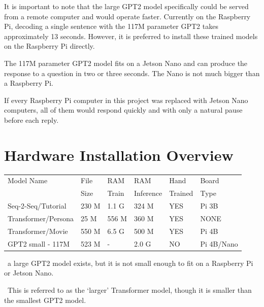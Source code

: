 It is important to note that the large GPT2 model specifically could be served from a remote computer and would operate faster. Currently on the Raspberry Pi, decoding a single sentence with the 117M parameter GPT2 takes approximately 13 seconds. However, it is preferred to install these trained models on the Raspberry Pi directly.

The 117M parameter GPT2 model fits on a Jetson Nano and can produce the response to a question in two or three seconds. The Nano is not much bigger than a Raspberry Pi.

If every Raspberry Pi computer in this project was replaced with Jetson Nano computers, all of them would respond quickly and with only a natural pause before each reply.

\section{Hardware Installation Overview}



\begin{table}[H]
	
	\begin{center}
		
		
		\begin{tabular}{llllll}
			
			Model Name    & File  & RAM  & RAM    & Hand & Board \\
			&  Size & Train   & Inference    & Trained &   Type \\
			\hline
			\hline
			Seq-2-Seq/Tutorial & 230 M     & 1.1 G & 324 M             & YES  &  Pi 3B \\
			Transformer/Persona   & 25 M      & 556 M & 360 M          & YES  & NONE \\
			Transformer/Movie \dag \dag  & 550 M      & 6.5 G & 500 M  & YES    & Pi 4B  \\
			GPT2 small - 117M \dag   & 523 M  & -   & 2.0 G         & NO     &  Pi 4B/Nano \\
			\hline
		\end{tabular}
		
		\bigskip
	\end{center}
		\dag \ a large GPT2 model exists, but it is not small enough to fit on a Raspberry Pi or Jetson Nano.
		
		\dag \dag \ This is referred to as the `larger' Transformer model, though it is smaller than the smallest GPT2 model.
		
	
	\label{fig:modeloverview}
\end{table}


